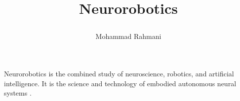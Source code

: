 \documentclass[a4paper]{article}
\title{\chapter*{Neurorobotics}
}
\date{}
\author{Mohammad Rahmani}
\begin{document}
\maketitle
    Neurorobotics is the combined study of neuroscience, robotics, and artificial intelligence. It is the science and technology of embodied autonomous neural systems .
    
    
\end{document}
